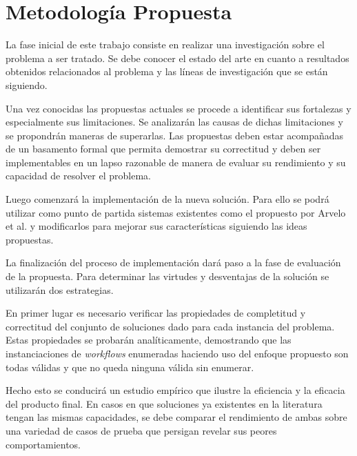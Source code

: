 \section{Metodología Propuesta}

La fase inicial de este trabajo consiste en realizar una investigación sobre el
problema a ser tratado. Se debe conocer el estado del arte en cuanto a resultados obtenidos
relacionados al problema y las líneas de investigación que se están siguiendo.

Una vez conocidas las propuestas actuales se procede a identificar sus
fortalezas y especialmente sus limitaciones. Se analizarán las causas de
dichas limitaciones y se propondrán maneras de superarlas. Las propuestas deben
estar acompañadas de un basamento formal que permita demostrar su correctitud y
deben ser implementables en un lapso razonable de manera de evaluar su
rendimiento y su capacidad de resolver el problema.

Luego comenzará la implementación de la nueva solución. Para ello se podrá
utilizar como punto de partida sistemas existentes como el propuesto por Arvelo
et al. \cite{arvelo:aaai06} y modificarlos para mejorar
sus características siguiendo las ideas propuestas.

La finalización del proceso de implementación dará paso a la fase de evaluación de
la propuesta. Para determinar las virtudes y desventajas de la solución se utilizarán
dos estrategias.

En primer lugar es necesario verificar las propiedades de completitud y
correctitud del conjunto de soluciones dado para cada instancia del problema.
Estas propiedades se probarán analíticamente, demostrando que las instanciaciones
de \emph{workflows} enumeradas haciendo uso del enfoque propuesto son todas válidas
y que no queda ninguna válida sin enumerar.

Hecho esto se conducirá un estudio empírico que ilustre la eficiencia
y la eficacia del producto final. En casos en
que soluciones ya existentes en la literatura tengan las mismas capacidades, se
debe comparar el rendimiento de ambas sobre una variedad de casos de prueba que
persigan revelar sus peores comportamientos.

